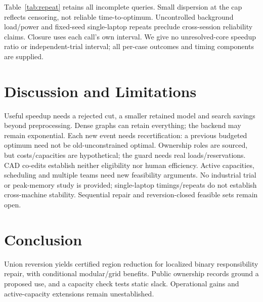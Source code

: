 \documentclass[conference]{IEEEtran}
\begin{document}
Table~\ref{tab:repeat} retains all incomplete queries. Small dispersion at the cap reflects censoring, not reliable time-to-optimum. Uncontrolled background load/power and fixed-seed single-laptop repeats preclude cross-session reliability claims. Closure uses each call's own interval. We give no unresolved-core speedup ratio or independent-trial interval; all per-case outcomes and timing components are supplied.

\section{Discussion and Limitations}
Useful speedup needs a rejected cut, a smaller retained model and search savings beyond preprocessing. Dense graphs can retain everything; the backend may remain exponential. Each new event needs recertification: a previous budgeted optimum need not be old-unconstrained optimal. Ownership roles are sourced, but costs/capacities are hypothetical; the guard needs real loads/reservations. CAD co-edits establish neither eligibility nor human efficiency. Active capacities, scheduling and multiple teams need new feasibility arguments. No industrial trial or peak-memory study is provided; single-laptop timings/repeats do not establish cross-machine stability. Sequential repair and reversion-closed feasible sets remain open.

\section{Conclusion}
Union reversion yields certified region reduction for localized binary responsibility repair, with conditional modular/grid benefits. Public ownership records ground a proposed use, and a capacity check tests static slack. Operational gains and active-capacity extensions remain unestablished.
\end{document}
